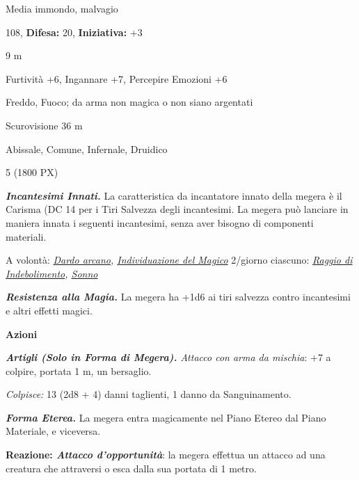 \begin{multicols}{2}
{
\noindent
\begin{description}[noitemsep, topsep=0pt, parsep=0pt, partopsep=0pt, leftmargin=0cm, labelwidth=2.2cm]
	\item[\textbf{Taglia/Tipo:}] Media immondo, malvagio
	\item[\textbf{Caratt.:}] 
	\item[\textbf{Punti Ferita:}] 108,  \textbf{Difesa:} 20,  \textbf{Iniziativa:} +3
	\item[\textbf{Movimento:}] 9 m
	\item[\textbf{Tiri Salvez.:}] 
	\item[\textbf{Comp.:}] Furtività +6, Ingannare +7, Percepire Emozioni +6
	\item[\textbf{Res. Danni:}] Freddo, Fuoco; da arma non magica o non siano argentati
	\item[\textbf{Sensi:}] Scurovisione 36 m
	\item[\textbf{Linguaggi:}] Abissale, Comune, Infernale, Druidico
	\item[\textbf{Sfida:}] 5 (1800 PX)\smallskip
\end{description}

\emph{\textbf{Incantesimi Innati.}} La caratteristica da incantatore innato della megera è il Carisma (DC 14 per i Tiri Salvezza degli incantesimi. La megera può lanciare in maniera innata i seguenti incantesimi, senza aver bisogno di componenti materiali.

A volontà: \emph{\hyperlink{Dardo arcano}{Dardo arcano}, \hyperlink{Individuazione del Magico}{Individuazione del Magico}} 2/giorno ciascuno: \emph{\hyperlink{Raggio di Indebolimento}{Raggio di Indebolimento}, \hyperlink{Sonno}{Sonno}}

\emph{\textbf{Resistenza alla Magia.}} La megera ha +1d6 ai tiri salvezza contro incantesimi e altri effetti magici.

\textbf{Azioni}

\emph{\textbf{Artigli (Solo in Forma di Megera).} Attacco con arma da mischia}: +7 a colpire, portata 1 m, un bersaglio.

\emph{Colpisce:} 13 (2d8 + 4) danni taglienti, 1 danno da Sanguinamento.

\emph{\textbf{Forma Eterea.}} La megera entra magicamente nel Piano Etereo dal Piano Materiale, e viceversa.

\textbf{Reazione: \emph{Attacco d'opportunità}}: la megera effettua un attacco ad una creatura che attraversi o esca dalla sua portata di 1 metro.

}
\end{multicols}
